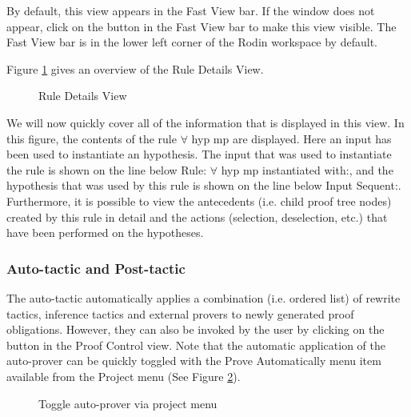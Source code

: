 By default, this view appears in the Fast View bar. If the window does not appear, click on the  button in the Fast View bar to make this view visible. The Fast View bar is in the lower left corner of the Rodin workspace by default.

Figure \ref{fig_ref_01_proving_perspective10} gives an overview of the \textsf{Rule Details View}.

\begin{figure}[!ht]
\begin{center}
	\caption{Rule Details View}
	\label{fig_ref_01_proving_perspective10}
\end{center}
\end{figure}

We will now quickly cover all of the information that is displayed in this view. In this figure, the contents of the rule \textsf{$\forall$ hyp mp} are displayed. Here an input has been used to instantiate an hypothesis. The input that was used to instantiate the rule is shown on the line below \textsf{Rule: $\forall$ hyp mp instantiated with:}, and the hypothesis that was used by this rule is shown on the line below \textsf{Input Sequent:}. Furthermore, it is possible to view the antecedents (i.e. child proof tree nodes) created by this rule in detail and the actions (selection, deselection, etc.) that have been performed on the hypotheses. 

\subsubsection{Auto-tactic and Post-tactic}

The auto-tactic automatically applies a combination (i.e. ordered list) of rewrite tactics, inference tactics and external provers to newly generated proof obligations. However, they can also be invoked by the user by clicking on the  button in the \textsf{Proof Control} view. Note that the automatic application of the auto-prover can be quickly toggled with the \textsf{Prove Automatically} menu item available from the \textsf{Project} menu (See Figure \ref{fig_ref_01_proving_perspective11}).

\begin{figure}[!ht]
\begin{center}
	\caption{Toggle auto-prover via project menu}
	\label{fig_ref_01_proving_perspective11}
\end{center}
\end{figure}

